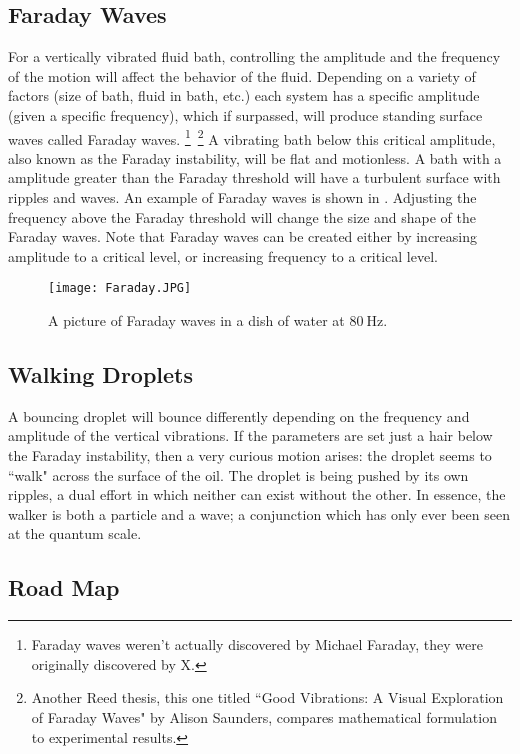 \subsection{Faraday Waves}
	    For a vertically vibrated fluid bath, controlling the amplitude and the frequency of the motion will affect the behavior of the fluid. Depending on a variety of factors (size of bath, fluid in bath, etc.) each system has a specific amplitude (given a specific frequency), which if surpassed, will produce standing surface waves called Faraday waves. \footnote{Faraday waves weren't actually discovered by Michael Faraday, they were originally discovered by X.}~\footnote{Another Reed thesis, this one titled ``Good Vibrations: A Visual Exploration of Faraday Waves" by Alison Saunders, compares mathematical formulation to experimental results.} A vibrating bath below this critical amplitude, also known as the Faraday instability, will be flat and motionless. A bath with a amplitude greater than the Faraday threshold will have a turbulent surface with ripples and waves. An example of Faraday waves is shown in . Adjusting the frequency above the Faraday threshold will change the size and shape of the Faraday waves. Note that Faraday waves can be created either by increasing amplitude to a critical level, or increasing frequency to a critical level.
	    
	    \begin{figure}[h!]
	\centering
	\texttt{[image: Faraday.JPG]}
	\caption{A picture of Faraday waves in a dish of water at $80~\mathrm{Hz}$.}
	\label{faraday waves}
\end{figure}

\subsection{Walking Droplets}
	    
	A bouncing droplet will bounce differently depending on the frequency and amplitude of the vertical vibrations. If the parameters are set just a hair below the Faraday instability, then a very curious motion arises: the droplet seems to ``walk" across the surface of the oil. The droplet is being pushed by its own ripples, a dual effort in which neither can exist without the other. In essence, the walker is both a particle and a wave; a conjunction which has only ever been seen at the quantum scale. 
	  
\subsection{Road Map}	  
	  

